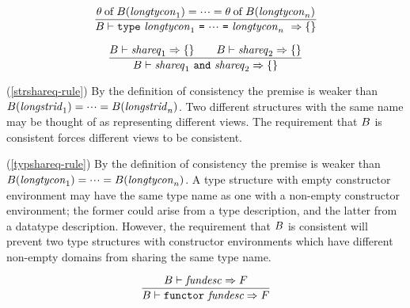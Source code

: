 \vspace{6pt}
\begin{equation}          %
\label{typshareq-rule}
\frac{ \of{\typefcn}{\B(\longtycon_1)}=\cdots=\of{\typefcn}{\B(\longtycon_n)} }
     { \B\ts\typshareq\ra\emptymap }
\end{equation}

\vspace{6pt}
\begin{equation}          %
\frac{ \B\ts\shareq_1\ra\emptymap\qquad\B\ts\shareq_2\ra\emptymap }
     { \B\ts\multshareq\ra\emptymap }
\end{equation}
\comments
\begin{description}
\item{(\ref{strshareq-rule})}
   By the definition of consistency the premise is weaker than\linebreak
$B({\it longstrid}_1) = \mbox{$\cdot\!\cdot\!\cdot$} = B({\it longstrid}_n)$.
Two different structures with the same name may be thought of
as representing different views. The requirement that $B$ is 
consistent forces different views to be consistent.
\end{description}
%
\begin{description}
\item{(\ref{typshareq-rule})}
   By 
the definition of consistency the premise is weaker than\linebreak
$B({\it longtycon}_1) = \mbox{$\cdot\!\cdot\!\cdot$} = B({\it longtycon}_n)$.
A type structure with empty constructor environment may have the
same type name as one with a non-empty constructor environment;
the former could arise from a type description, and the latter
from a datatype description. 
However, the requirement that $B$ is
consistent will prevent two type structures with constructor
environments which have different 
non-empty domains from sharing the same type name.

\end{description}
%
\begin{equation}        %
\label{singfunspec-rule}
\frac{ \B\ts\fundesc\ra\F }
     { \B\ts\singfunspec\ra\F }\index{44.2}
\end{equation}

